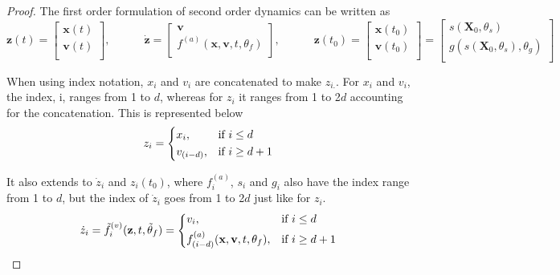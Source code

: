 \documentclass{article}
\theoremstyle{remark}
\theoremstyle{definition}
\begin{document}
\begin{proof}
The first order formulation of second order dynamics can be written as
\begin{equation}
    \mathbf{z}(t) = \begin{bmatrix}
           \mathbf{x}(t) \\
           \mathbf{v}(t) \\
         \end{bmatrix},
        \qquad
        \quad
    \dot{\mathbf{z}} = \begin{bmatrix}
        \mathbf{v} \\
        f^{(a)}(\mathbf{x}, \mathbf{v}, t, \theta_{f}) \\
     \end{bmatrix},
     \qquad
     \quad
     \mathbf{z}(t_{0}) = \begin{bmatrix}
           \mathbf{x}(t_{0}) \\
           \mathbf{v}(t_{0}) \\
         \end{bmatrix}
         = \begin{bmatrix}
           s(\mathbf{X}_{0}, \theta_{s}) \\
           g(s(\mathbf{X}_{0}, \theta_{s}), \theta_{g}) \\
         \end{bmatrix}
\end{equation}

When using index notation, $x_{i}$ and $v_{i}$ are concatenated to make $z_{i.}$. For $x_{i}$ and $v_{i}$, the index, i, ranges from 1 to $d$, whereas for $z_{i}$ it ranges from 1 to 2$d$ accounting for the concatenation. This is represented below
\begin{equation}
\label{eqn: z_as_x_v}
    z_{i}= 
\begin{dcases}
    x_{i},& \text{if } i\leq d\\
    v_{(i-d)},              & \text{if } i\geq d+1 \\
\end{dcases}
\end{equation}

It also extends to $\dot{z}_{i}$ and $z_{i}(t_{0})$, where $f^{(a)}_{i}$, $s_{i}$ and $g_{i}$ also have the index range from 1 to $d$, but the index of $\dot{z}_{i}$ goes from 1 to 2$d$ just like for $z_{i}$.
\begin{equation}
\label{eqn: z_dot_as_v_f}
    \dot{z}_{i}= \tilde{f}^{(v)}_{i}(\mathbf{z}, t, \tilde{\theta}_{f})=
\begin{dcases}
    v_{i},& \text{if } i\leq d\\
    f^{(a)}_{(i-d)}(\mathbf{x}, \mathbf{v}, t, \theta_{f}),              & \text{if } i\geq d+1 \\
\end{dcases}
\end{equation}


\end{proof}
\end{document}
